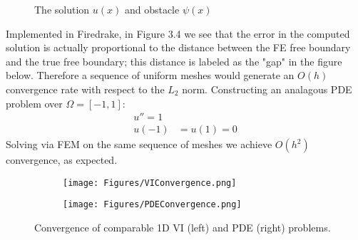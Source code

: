 \documentclass[12 pt]{report}
\begin{document}
\begin{figure}[H]
  \centering
\caption{The solution $u(x)$ and obstacle $\psi(x)$}
\end{figure}




Implemented in Firedrake, in Figure 3.4 we see that the error in the computed solution is actually proportional to the distance between the FE free boundary and the true free boundary; this distance is labeled as the "gap" in the figure below. Therefore a sequence of uniform meshes would generate an $O(h)$ convergence rate with respect to the $L_2$ norm. Constructing an analagous PDE problem over $\Omega = [-1, 1]$:
\begin{align}
  u'' = 1\\
  u(-1) &= u(1) = 0
\end{align}
 Solving via FEM on the same sequence of meshes we achieve $O(h^2)$ convergence, as expected. 

\begin{figure}[H]
  \begin{center}
    \begin{subfigure}[b]{0.49\textwidth}
      \centering
      \texttt{[image: Figures/VIConvergence.png]}
      \label{fig:VI Reference Problem}
    \end{subfigure} 
    \begin{subfigure}[b]{0.49\textwidth}
      \centering
      \texttt{[image: Figures/PDEConvergence.png]}
      \label{fig:PDE Reference Problem}
    \end{subfigure}
    \caption{Convergence of comparable 1D VI (left) and PDE (right) problems.}
    \label{fig: Free Boundary Error}
  \end{center}
\end{figure}
\end{document}
